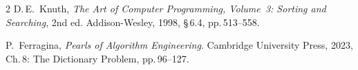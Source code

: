 \documentclass[10pt,a4paper,twocolumn]{article}
\begin{document}
\begin{thebibliography}{2}
D.\,E.~Knuth, \textit{The Art of Computer Programming, Volume~3: Sorting and Searching}, 2nd ed. Addison-Wesley, 1998, \S\,6.4, pp.\,513--558.

P.~Ferragina, \textit{Pearls of Algorithm Engineering}. Cambridge University Press, 2023, Ch.\,8: The Dictionary Problem, pp.\,96--127.
\end{thebibliography}
\end{document}
